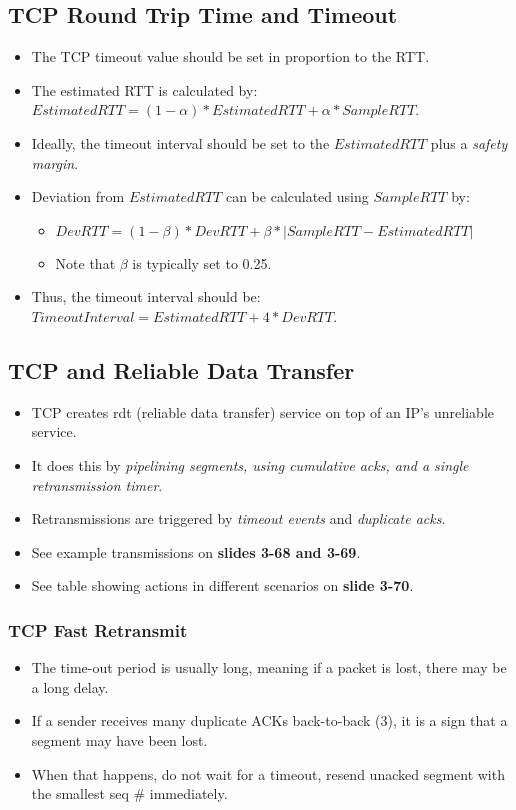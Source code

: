 \documentclass{article}
\begin{document}
\subsection{TCP Round Trip Time and Timeout}

\begin{itemize}
\item The TCP timeout value should be set in proportion to the RTT.
\item The estimated RTT is calculated by: $EstimatedRTT = (1 - \alpha)*EstimatedRTT + \alpha*SampleRTT$.
\item Ideally, the timeout interval should be set to the $EstimatedRTT$ plus a \emph{safety margin}.
\item Deviation from $EstimatedRTT$ can be calculated using $SampleRTT$ by:
\begin{itemize}
\item $DevRTT = (1-\beta)*DevRTT + \beta*|SampleRTT-EstimatedRTT|$
\item Note that $\beta$ is typically set to 0.25.
\end{itemize}
\item Thus, the timeout interval should be: $TimeoutInterval = EstimatedRTT + 4*DevRTT$.
\end{itemize}

\subsection{TCP and Reliable Data Transfer}

\begin{itemize}
\item TCP creates rdt (reliable data transfer) service on top of an IP's unreliable service.
\item It does this by \emph{pipelining segments, using cumulative acks, and a single retransmission timer}.
\item Retransmissions are triggered by \emph{timeout events} and \emph{duplicate acks}.
\item See example transmissions on {\bf slides 3-68 and 3-69}.
\item See table showing actions in different scenarios on {\bf slide 3-70}.
\end{itemize}

\subsubsection{TCP Fast Retransmit}
\begin{itemize}
\item The time-out period is usually long, meaning if a packet is lost, there may be a long delay.
\item If a sender receives many duplicate ACKs back-to-back (3), it is a sign that a segment may have been lost.
\item When that happens, do not wait for a timeout, resend unacked segment with the smallest seq \# immediately.
\end{itemize}
\end{document}

